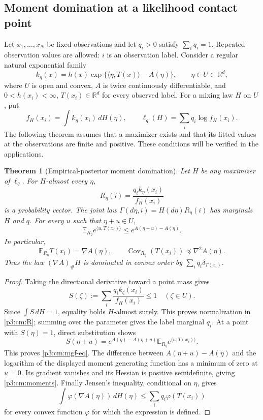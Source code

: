 \documentclass[11pt,a4paper]{article}
\newtheorem{theorem}{Theorem}[section]
\theoremstyle{definition}
\theoremstyle{remark}
\numberwithin{equation}{section}
\begin{document}
\subsection{Moment domination at a likelihood contact point}

Let $x_1,\ldots,x_N$ be fixed observations and let $q_i>0$ satisfy
$\sum_iq_i=1$.  Repeated observation values are allowed: $i$ is an
observation label.  Consider a regular natural exponential family
\[
 k_\eta(x)=h(x)\exp\{\langle\eta,T(x)\rangle-A(\eta)\},
 \qquad \eta\in U\subset\mathbb R^d,
\]
where $U$ is open and convex, $A$ is twice continuously differentiable,
and $0<h(x_i)<\infty$, $T(x_i)\in\mathbb R^d$ for every observed label.
For a mixing law $H$ on $U$, put
\[
 f_H(x_i)=\int k_\eta(x_i)\,dH(\eta),\qquad
 \ell_q(H)=\sum_iq_i\log f_H(x_i).
\]
The following theorem assumes that a maximizer exists and that its
fitted values at the observations are finite and positive.  These
conditions will be verified in the applications.

\begin{theorem}[Empirical-posterior moment domination]
\label{p3:cm:mgf}
Let $H$ be any maximizer of $\ell_q$.  For $H$-almost every $\eta$,
\begin{equation}\label{p3:cm:R}
 R_\eta(i)=\frac{q_i k_\eta(x_i)}{f_H(x_i)}
\end{equation}
is a probability vector.  The joint law
$\Gamma(d\eta,i)=H(d\eta)R_\eta(i)$ has marginals $H$ and $q$.
For every $u$ such that $\eta+u\in U$,
\begin{equation}\label{p3:cm:mgf-eq}
 \mathbb E_{R_\eta}e^{\langle u,T(x_i)\rangle}
 \le e^{A(\eta+u)-A(\eta)}.
\end{equation}
In particular,
\begin{equation}\label{p3:cm:moments}
 \mathbb E_{R_\eta}T(x_i)=\nabla A(\eta),\qquad
 \operatorname{Cov}_{R_\eta}(T(x_i))\preceq\nabla^2A(\eta).
\end{equation}
Thus the law $(\nabla A)_\#H$ is dominated in convex order by
$\sum_iq_i\delta_{T(x_i)}$.
\end{theorem}

\begin{proof}
Taking the directional derivative toward a point mass gives
\[
 S(\zeta):=\sum_i\frac{q_i k_\zeta(x_i)}{f_H(x_i)}\le1
 \quad(\zeta\in U).
\]
Since $\int S\,dH=1$, equality holds $H$-almost surely.  This proves
normalization in \eqref{p3:cm:R}; summing over the parameter gives the
label marginal $q_i$.  At a point with $S(\eta)=1$, direct substitution
shows
\[
 S(\eta+u)=e^{A(\eta)-A(\eta+u)}
             \mathbb E_{R_\eta}e^{\langle u,T(x_i)\rangle}.
\]
This proves \eqref{p3:cm:mgf-eq}.  The difference between
$A(\eta+u)-A(\eta)$ and the logarithm of the displayed moment generating
function has a minimum of zero at $u=0$.  Its gradient vanishes and its
Hessian is positive semidefinite, giving \eqref{p3:cm:moments}.
Finally Jensen's inequality, conditional on $\eta$, gives
\[
 \int\varphi(\nabla A(\eta))\,dH(\eta)
 \le\sum_iq_i\varphi(T(x_i))
\]
for every convex function $\varphi$ for which the expression is defined.
\end{proof}
\end{document}
